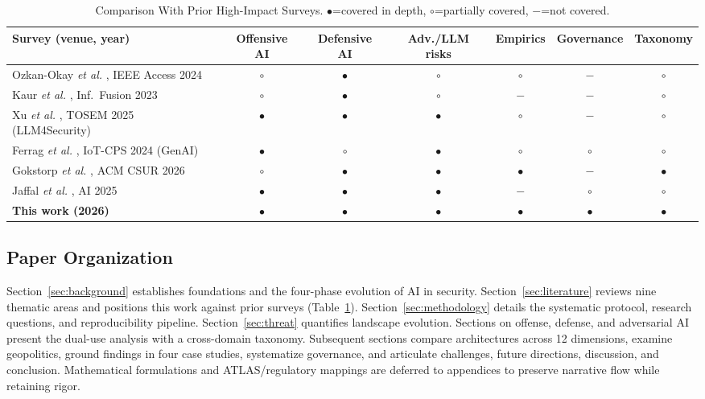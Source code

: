 \documentclass[conference,10pt,twocolumn,a4paper]{IEEEtran}
\begin{document}
\begin{table}[t]
\caption{Comparison With Prior High-Impact Surveys. $\bullet$=covered in depth, $\circ$=partially covered, $-$=not covered.}
\label{tab:relatedsurveys}
\centering
\footnotesize
\begin{tabular}{lcccccc}
\toprule
Survey (venue, year) & Offensive AI & Defensive AI & Adv./LLM risks & Empirics & Governance & Taxonomy \\
\midrule
Ozkan-Okay \emph{et al.} \cite{ozkan2024cybersecurity}, IEEE Access 2024 & $\circ$ & $\bullet$ & $\circ$ & $\circ$ & $-$ & $\circ$ \\
Kaur \emph{et al.} \cite{kaur2023deep}, Inf.\ Fusion 2023 & $\circ$ & $\bullet$ & $\circ$ & $-$ & $-$ & $\circ$ \\
Xu \emph{et al.} \cite{xu2025large}, TOSEM 2025 (LLM4Security) & $\bullet$ & $\bullet$ & $\bullet$ & $\circ$ & $-$ & $\circ$ \\
Ferrag \emph{et al.} \cite{ferrag2024generative}, IoT-CPS 2024 (GenAI) & $\bullet$ & $\circ$ & $\bullet$ & $\circ$ & $\circ$ & $\circ$ \\
Gokstorp \emph{et al.} \cite{gokstorp2026survey}, ACM CSUR 2026 & $\circ$ & $\bullet$ & $\bullet$ & $\bullet$ & $-$ & $\bullet$ \\
Jaffal \emph{et al.} \cite{jaffal2025artificial}, AI 2025 & $\bullet$ & $\bullet$ & $\bullet$ & $-$ & $\circ$ & $\circ$ \\
\textbf{This work (2026)} & $\bullet$ & $\bullet$ & $\bullet$ & $\bullet$ & $\bullet$ & $\bullet$ \\
\bottomrule
\end{tabular}
\end{table}

\subsection{Paper Organization}
Section~\ref{sec:background} establishes foundations and the four-phase evolution of AI in security. Section~\ref{sec:literature} reviews nine thematic areas and positions this work against prior surveys (Table~\ref{tab:relatedsurveys}). Section~\ref{sec:methodology} details the systematic protocol, research questions, and reproducibility pipeline. Section~\ref{sec:threat} quantifies landscape evolution. Sections on offense, defense, and adversarial AI present the dual-use analysis with a cross-domain taxonomy. Subsequent sections compare architectures across 12 dimensions, examine geopolitics, ground findings in four case studies, systematize governance, and articulate challenges, future directions, discussion, and conclusion. Mathematical formulations and ATLAS/regulatory mappings are deferred to appendices to preserve narrative flow while retaining rigor.
\end{document}
